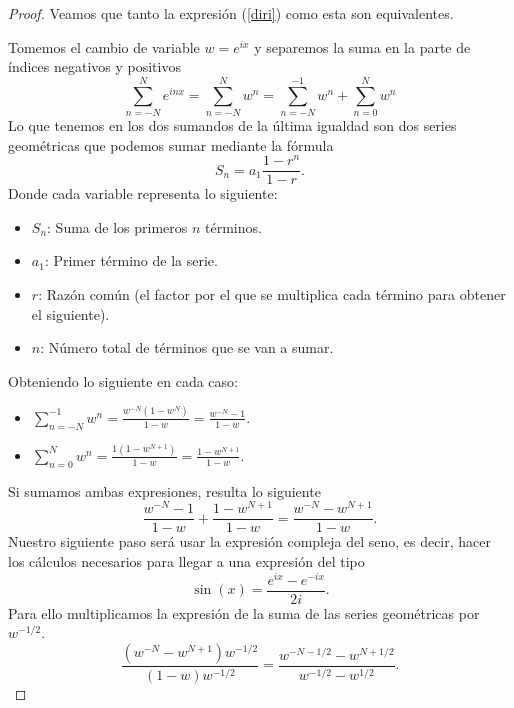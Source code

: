 \documentclass[12pt]{article}
\theoremstyle{plain}
\theoremstyle{definition}
\numberwithin{equation}{section}
\begin{document}
        \begin{proof}
            Veamos que tanto la expresión (\ref{diri}) como esta son equivalentes.
            
            Tomemos el cambio de variable \(w = e^{ix}\) y separemos la suma en la parte de índices negativos y positivos
            \begin{equation*}
                \sum_{n = -N}^{N} e^{inx} = \sum_{n = -N}^{N} w^{n} = \sum_{n = -N}^{-1} w^{n} + \sum_{n = 0}^{N} w^{n}
            \end{equation*}
            Lo que tenemos en los dos sumandos de la última igualdad son dos series geométricas que podemos sumar mediante la fórmula
            $$S_n = a_1 \frac{1 - r^n}{1 - r}.$$
            Donde cada variable representa lo siguiente:
            \begin{itemize}
                \item $S_n$: Suma de los primeros $n$ términos.
                \item $a_1$: Primer término de la serie.
                \item $r$: Razón común (el factor por el que se multiplica cada término para obtener el siguiente).
                \item $n$: Número total de términos que se van a sumar.
            \end{itemize}
            Obteniendo lo siguiente en cada caso:
            \begin{itemize}
                \item \(\sum_{n = -N}^{-1} w^{n} = \frac{w^{-N} (1-w^N)}{1-w} = \frac{w^{-N}-1}{1-w}.\)
                \item \(\sum_{n = 0}^{N} w^{n} = \frac{1 (1-w^{N+1})}{1-w} = \frac{1-w^{N+1}}{1-w}.\)
            \end{itemize}
            Si sumamos ambas expresiones, resulta lo siguiente
            \begin{equation*}
                \frac{w^{-N}-1}{1-w} + \frac{1-w^{N+1}}{1-w} = \frac{w^{-N} - w^{N+1}}{1-w}.
            \end{equation*}
            Nuestro siguiente paso será usar la expresión compleja del seno, es decir, hacer los cálculos necesarios para llegar a una expresión del tipo
            $$\sin (x) = \frac{e^{ix} - e^{-ix}}{2i}.$$
            Para ello multiplicamos la expresión de la suma de las series geométricas por \(w^{-1/2}\).
            \begin{equation*}
                \frac{\left(w^{-N} - w^{N+1}\right) w^{-1/2}}{\left(1-w\right) w^{-1/2}} = \frac{w^{-N-1/2} - w^{N+1/2}}{w^{-1/2}-w^{1/2}}.

\end{equation*}
\end{proof}
\end{document}
